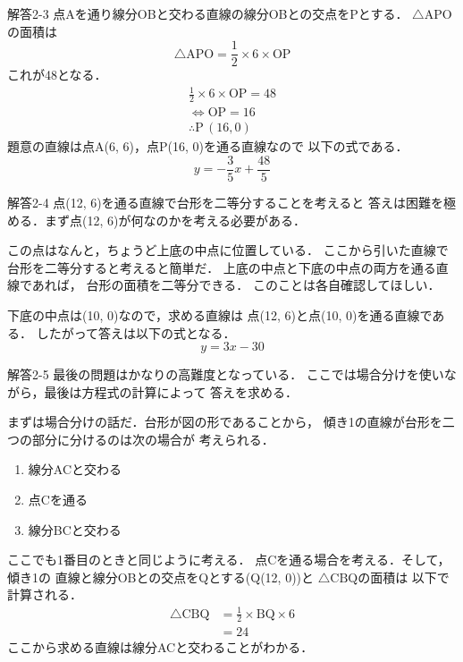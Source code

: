 \documentclass[dvipdfmx]{beamer}
\begin{document}
	\begin{frame}{解答2-3}
		点Aを通り線分OBと交わる直線の線分OBとの交点をPとする．
		$\triangle\mathrm{APO}$の面積は
		\[\triangle\mathrm{APO}= \frac{1}{2}\times 6\times\mathrm{OP}\]
		これが48となる．
		\begin{gather*}
			\frac{1}{2}\times 6\times\mathrm{OP}=48\\
			\Leftrightarrow\mathrm{OP}=16\\
			\therefore\mathrm{P}\, (16, 0)
		\end{gather*}
		題意の直線は点A(6, 6)，点P(16, 0)を通る直線なので
		以下の式である．
		\[y = - \frac{3}{5}x + \frac{48}{5}\]
	\end{frame}

	\begin{frame}{解答2-4}
		点(12, 6)を通る直線で台形を二等分することを考えると
		答えは困難を極める．まず点(12, 6)が何なのかを考える必要がある．

		この点はなんと，ちょうど上底の中点に位置している．
		ここから引いた直線で台形を二等分すると考えると簡単だ．
		上底の中点と下底の中点の両方を通る直線であれば，
		台形の面積を二等分できる．
		このことは各自確認してほしい．

		下底の中点は(10, 0)なので，求める直線は
		点(12, 6)と点(10, 0)を通る直線である．
		したがって答えは以下の式となる．
		\[y = 3x - 30\]
	\end{frame}


	\begin{frame}{解答2-5}
		最後の問題はかなりの高難度となっている．
		ここでは場合分けを使いながら，最後は方程式の計算によって
		答えを求める．

		まずは場合分けの話だ．台形が図の形であることから，
		傾き1の直線が台形を二つの部分に分けるのは次の場合が
		考えられる．
		\begin{enumerate}
			\item 線分ACと交わる
			\item 点Cを通る
			\item 線分BCと交わる
		\end{enumerate}
		ここでも1番目のときと同じように考える．
		点Cを通る場合を考える．そして，傾き1の
		直線と線分OBとの交点をQとする(Q(12, 0))と
		$\triangle\mathrm{CBQ}$の面積は
		以下で計算される．
		\begin{align*}
			\triangle\mathrm{CBQ} &= \frac{1}{2}\times \mathrm{BQ}\times 6\\
								  &= 24
		\end{align*}
		ここから求める直線は線分ACと交わることがわかる．
	\end{frame}
\end{document}
